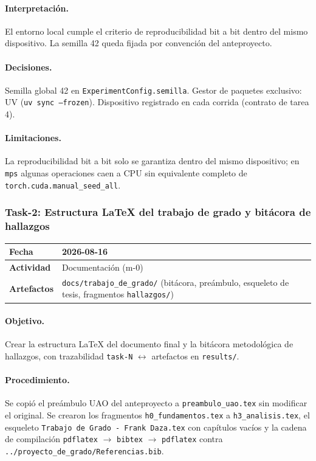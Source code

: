 \paragraph{Interpretación.}
El entorno local cumple el criterio de reproducibilidad bit a bit dentro del mismo
dispositivo. La semilla 42 queda fijada por convención del anteproyecto.

\paragraph{Decisiones.}
Semilla global 42 en \texttt{ExperimentConfig.semilla}.
Gestor de paquetes exclusivo: UV (\texttt{uv sync --frozen}).
Dispositivo registrado en cada corrida (contrato de tarea 4).

\paragraph{Limitaciones.}
La reproducibilidad bit a bit solo se garantiza dentro del mismo dispositivo;
en \texttt{mps} algunas operaciones caen a CPU sin equivalente completo de
\texttt{torch.cuda.manual\_seed\_all}.

\subsubsection{Task-2: Estructura LaTeX del trabajo de grado y bitácora de hallazgos}
\label{hallazgo:task-2}
\begin{tabularx}{\textwidth}{|l|X|}\hline
\textbf{Fecha} & 2026-08-16 \\\hline
\textbf{Actividad} & Documentación (m-0) \\\hline
\textbf{Artefactos} & \texttt{docs/trabajo\_de\_grado/} (bitácora, preámbulo, esqueleto de tesis, fragmentos \texttt{hallazgos/}) \\\hline
\end{tabularx}

\paragraph{Objetivo.}
Crear la estructura LaTeX del documento final y la bitácora metodológica de hallazgos,
con trazabilidad \texttt{task-N} $\leftrightarrow$ artefactos en \texttt{results/}.

\paragraph{Procedimiento.}
Se copió el preámbulo UAO del anteproyecto a \texttt{preambulo\_uao.tex} sin modificar
el original. Se crearon los fragmentos \texttt{h0\_fundamentos.tex} a \texttt{h3\_analisis.tex},
el esqueleto \texttt{Trabajo de Grado - Frank Daza.tex} con capítulos vacíos y la cadena
de compilación \texttt{pdflatex} $\rightarrow$ \texttt{bibtex} $\rightarrow$ \texttt{pdflatex}
contra \texttt{../proyecto\_de\_grado/Referencias.bib}.

